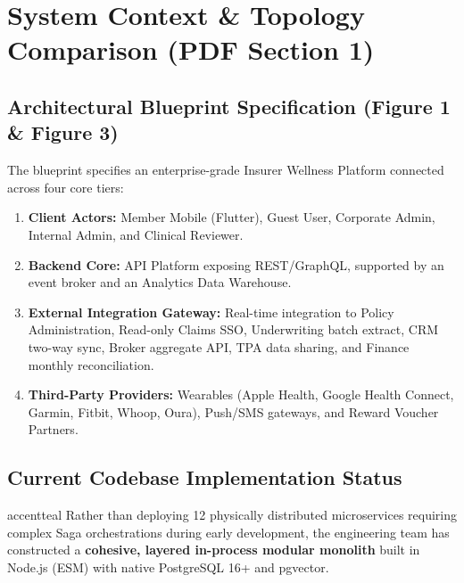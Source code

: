 \documentclass[11pt,a4paper]{article}
\begin{document}
\newpage

\section{System Context \& Topology Comparison (PDF Section 1)}

\subsection{Architectural Blueprint Specification (Figure 1 \& Figure 3)}
The blueprint specifies an enterprise-grade Insurer Wellness Platform connected across four core tiers:
\begin{enumerate}[leftmargin=1.5em]
    \item \textbf{Client Actors:} Member Mobile (Flutter), Guest User, Corporate Admin, Internal Admin, and Clinical Reviewer.
    \item \textbf{Backend Core:} API Platform exposing REST/GraphQL, supported by an event broker and an Analytics Data Warehouse.
    \item \textbf{External Integration Gateway:} Real-time integration to Policy Administration, Read-only Claims SSO, Underwriting batch extract, CRM two-way sync, Broker aggregate API, TPA data sharing, and Finance monthly reconciliation.
    \item \textbf{Third-Party Providers:} Wearables (Apple Health, Google Health Connect, Garmin, Fitbit, Whoop, Oura), Push/SMS gateways, and Reward Voucher Partners.
\end{enumerate}

\subsection{Current Codebase Implementation Status}
\begin{statusbox}{accentteal}
    Rather than deploying 12 physically distributed microservices requiring complex Saga orchestrations during early development, the engineering team has constructed a \textbf{cohesive, layered in-process modular monolith} built in Node.js (ESM) with native PostgreSQL 16+ and pgvector.
\end{statusbox}
\end{document}
